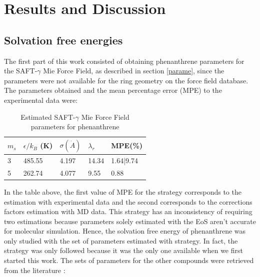 \chapter{Results and Discussion} %

\label{Chapter5} %

\section{Solvation free energies}

The first part of this work consisted of obtaining phenanthrene parameters for the SAFT-$\gamma$ Mie Force Field, as  described in section \ref{parame}, since the parameters were not available for the ring geometry on the force field database. The parameters obtained and the mean percentage error (MPE) to the experimental data were:

\begin{table}[h]
	\centering
	\caption{Estimated SAFT-$\gamma$ Mie Force Field parameters for phenanthrene}
	\label{tbl:estimparameters}
	\begin{tabular}{lllll}
		\hline
		 $m_s$ & $\epsilon/k_{B}$ (K) & $\sigma (\dot{A})$ & $\lambda_r$& MPE(\%) \\ \hline
		 3 \cite{lafitte2012}    & 485.55              & 4.197              & 14.34 & 1.64|9.74       \\ 
		 5  \cite{muller2017}   & 262.74               & 4.077              & 9.55   &  0.88   \\ \hline
	\end{tabular}
	
\end{table} 

In the table above, the first value of MPE for the  strategy corresponds to the estimation with experimental data and the second corresponds to the corrections factors estimation with MD data. This strategy has an inconsistency of requiring two estimations because parameters solely  estimated with the EoS aren't accurate for molecular simulation. Hence, the solvation free energy of phenanthrene was only studied with the set of parameters estimated with  strategy. In fact, the \cite{lafitte2012} strategy was only followed because it was the only one available when we first started this work. The sets of parameters for the other compounds were retrieved from the literature \cite{lobanova2016,herdes2015,ervik2016,muller2017}:

